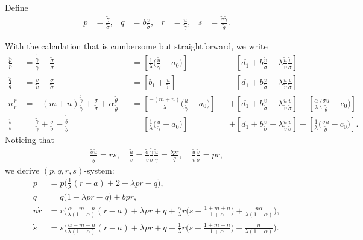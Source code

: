 \documentclass[a4paper,11pt]{article}
\def\tg{{\tilde{\gamma}}}
\def\tv{{\tilde{v}}}
\def\tth{{\tilde{\theta}}}
\def\ts{{\tilde{\sigma}}}
\def\tu{{\tilde{u}}}
\def\dtg{{\dot{\tilde{\gamma}}}}
\def\dtv{{\dot{\tilde{v}}}}
\def\dtth{{\dot{\tilde{\theta}}}}
\def\dts{{\dot{\tilde{\sigma}}}}
\def\dpp{\dot{p}}
\def\dqq{\dot{q}}
\def\drr{\dot{r}}
\begin{document}
Define 
\begin{equation}\label{eq:pqrsdef}
 \begin{aligned}
  p &= \frac{\tg}{\ts}, & q&=b \frac{\tv}{\ts}, &  r &= \frac{\tu}{\tg}, & s&=\frac{\ts\tg}{\tth}.
 \end{aligned}
\end{equation} 
 
With the calculation that is cumbersome but straightforward, we write
\begin{align*}
 \frac{\dpp}{p}&=\frac{\dtg}{\tg} - \frac{\dts}{\ts}& &=\left[\frac{1}{\lambda }\Big(\frac{\tu}{\tg}-a_0\Big)\right] & &-\left[d_1 + b\frac{\tv}{\ts} + \lambda\frac{\tu}{\tv}\frac{\tv}{\ts}\right]\\
 \frac{\dqq}{q}&=\frac{\dtv}{\tv} - \frac{\dts}{\ts}& &=\left[b_1 +\frac{\tu}{\tv}\right] & &-\left[d_1 + b\frac{\tv}{\ts} + \lambda\frac{\tu}{\tv}\frac{\tv}{\ts}\right]\\
 n\frac{\drr}{r}&=-(m+n)\frac{\dtg}{\tg}+\frac{\dts}{\ts} + \alpha\frac{\dtth}{\tth} & &=\left[\frac{-(m+n)}{\lambda}\Big(\frac{\tu}{\tg}-a_0\Big)\right]& &+\left[d_1 + b\frac{\tv}{\ts} + \lambda\frac{\tu}{\tv}\frac{\tv}{\ts}\right] + \left[\frac{\alpha}{\lambda }\Big(\frac{\ts\tu}{\tth}-c_0\Big)\right]\\
 \frac{\dot{s}}{s} &= \frac{\dtg}{\tg} + \frac{\dts}{\ts} - \frac{\dtth}{\tth} & &=\left[\frac{1}{\lambda }\Big(\frac{\tu}{\tg}-a_0\Big)\right] & &+\left[d_1 + b\frac{\tv}{\ts} + \lambda\frac{\tu}{\tv}\frac{\tv}{\ts}\right] -\left[\frac{1}{\lambda }\Big(\frac{\ts\tu}{\tth}-c_0\Big)\right].%
\end{align*}
Noticing that
\begin{align*}
 \frac{\ts\tu}{\tth} = rs, \quad \frac{\tu}{\tv} = \frac{\ts}{\tv} \frac{\tg}{\ts} \frac{\tu}{\tg} = \frac{bpr}{q}, \quad \frac{\tu}{\tv} \frac{\tv}{\ts} = pr,
\end{align*}
we derive $(p,q,r,s)$-system:
\begin{equation}\label{eq:slow}
 \begin{aligned}
 \dot{p} &=p\Big(\frac{1}{\lambda}(r-a) + 2- \lambda p r -q\Big),\\
 \dot{q} &=q\Big(1 -\lambda p r -q\Big) + b p r,\\
 n\dot{r} &=r\Big(\frac{\alpha-m-n}{\lambda(1+\alpha)}(r-a) + \lambda pr + q +\frac{\alpha}{\lambda}r\big(s- \frac{1+m+n}{1+\alpha}\big) + \frac{n\alpha}{\lambda(1+\alpha)}\Big),\\
 \dot{s} &=s\Big(\frac{\alpha-m-n}{\lambda(1+\alpha)}(r-a) + \lambda pr + q - \frac{1}{\lambda}r\big(s- \frac{1+m+n}{1+\alpha}\big) - \frac{n}{\lambda(1+\alpha)}\Big).
 \end{aligned}
\end{equation}
\end{document}
